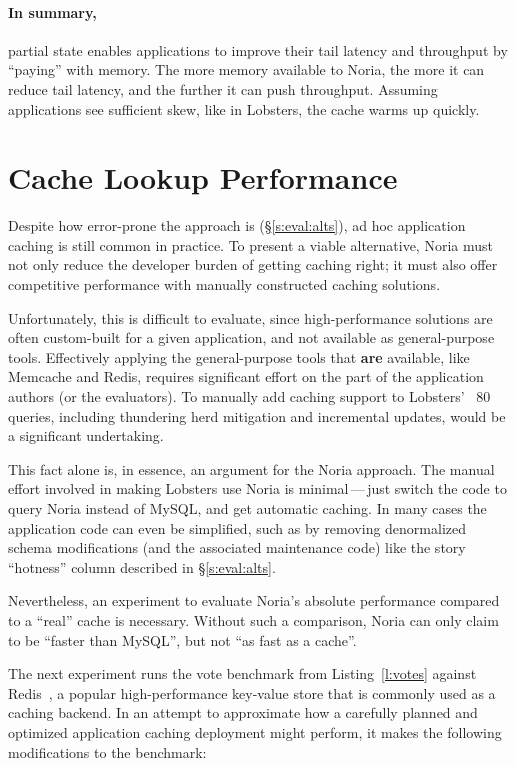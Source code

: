 \paragraph{In summary,} partial state enables applications to improve their
tail latency and throughput by ``paying'' with memory. The more memory available
to Noria, the more it can reduce tail latency, and the further it can push
throughput. Assuming applications see sufficient skew, like in Lobsters, the
cache warms up quickly.

\section{Cache Lookup Performance}
\label{s:eval:kvperf}

Despite how error-prone the approach is (\S\ref{s:eval:alts}), ad hoc
application caching is still common in practice. To present a viable
alternative, Noria must not only reduce the developer burden of getting caching
right; it must also offer competitive performance with manually constructed
caching solutions.

Unfortunately, this is difficult to evaluate, since high-performance solutions
are often custom-built for a given application, and not available as
general-purpose tools. Effectively applying the general-purpose tools that
\textbf{are} available, like Memcache and Redis, requires significant effort on
the part of the application authors (or the evaluators). To manually add caching
support to Lobsters' ~80 queries, including thundering herd mitigation and
incremental updates, would be a significant undertaking.

This fact alone is, in essence, an argument for the Noria approach. The manual
effort involved in making Lobsters use Noria is minimal\,---\,just switch the
code to query Noria instead of MySQL, and get automatic caching. In many cases
the application code can even be simplified, such as by removing denormalized
schema modifications (and the associated maintenance code) like the story
``hotness'' column described in \S\ref{s:eval:alts}.

Nevertheless, an experiment to evaluate Noria's absolute performance compared to
a ``real'' cache is necessary. Without such a comparison, Noria can only claim
to be ``faster than MySQL'', but not ``as fast as a cache''.

The next experiment runs the vote benchmark from Listing~\vref{l:votes} against
Redis~\cite{redis}, a popular high-performance key-value store that is commonly
used as a caching backend. In an attempt to approximate how a carefully planned
and optimized application caching deployment might perform, it makes the
following modifications to the benchmark:

